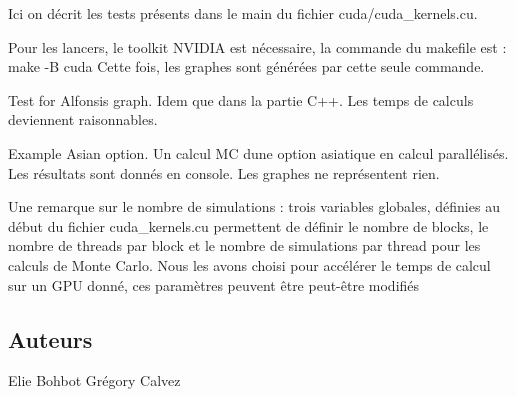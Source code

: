 Ici on décrit les tests présents dans le main du fichier cuda/cuda\+\_\+kernels.\+cu.

Pour les lancers, le toolkit N\+V\+I\+D\+IA est nécessaire, la commande du makefile est \+: \textquotesingle{}\textquotesingle{}\textquotesingle{} make -\/B cuda \textquotesingle{}\textquotesingle{}\textquotesingle{} Cette fois, les graphes sont générées par cette seule commande.


\begin{DoxyItemize}
\item Test for Alfonsi\textquotesingle{}s graph. Idem que dans la partie C++. Les temps de calculs deviennent raisonnables.
\item Example Asian option. Un calcul MC d\textquotesingle{}une option asiatique en calcul parallélisés. Les résultats sont donnés en console. Les graphes ne représentent rien.
\end{DoxyItemize}

Une remarque sur le nombre de simulations \+: trois variables globales, définies au début du fichier cuda\+\_\+kernels.\+cu permettent de définir le nombre de blocks, le nombre de threads par block et le nombre de simulations par thread pour les calculs de Monte Carlo. Nous les avons choisi pour accélérer le temps de calcul sur un G\+PU donné, ces paramètres peuvent être peut-\/être modifiés

\subsection*{Auteurs}

Elie Bohbot Grégory Calvez 